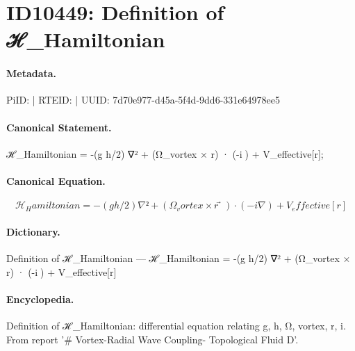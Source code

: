 \section*{ID10449: Definition of ℋ\_Hamiltonian}
\paragraph{Metadata.}
PiID:  | RTEID:  | UUID: 7d70e977-d45a-5f4d-9dd6-331e64978ee5

\paragraph{Canonical Statement.}
ℋ\_Hamiltonian = -(g h/2) ∇² + (Ω\_vortex × r⃗) · (-i∇) + V\_effective[r];

\paragraph{Canonical Equation.}
\[
ℋ_Hamiltonian = -(g h/2) ∇² + (Ω_vortex × r⃗) · (-i∇) + V_effective[r]
\]

\paragraph{Dictionary.}
Definition of ℋ\_Hamiltonian — ℋ\_Hamiltonian = -(g h/2) ∇² + (Ω\_vortex × r⃗) · (-i∇) + V\_effective[r]

\paragraph{Encyclopedia.}
Definition of ℋ\_Hamiltonian: differential equation relating g, h, Ω, vortex, r, i. From report '\# Vortex-Radial Wave Coupling- Topological Fluid D'.
